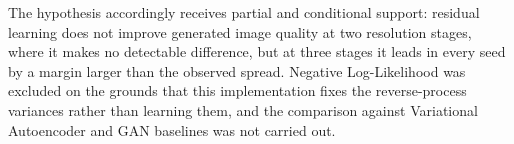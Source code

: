 The hypothesis accordingly receives partial and conditional support: residual learning does not
improve generated image quality at two resolution stages, where it makes no detectable difference,
but at three stages it leads in every seed by a margin larger than the observed spread. Negative Log-Likelihood was excluded on the
grounds that this implementation fixes the reverse-process variances rather than learning them, and
the comparison against Variational Autoencoder and GAN baselines was not carried out.
